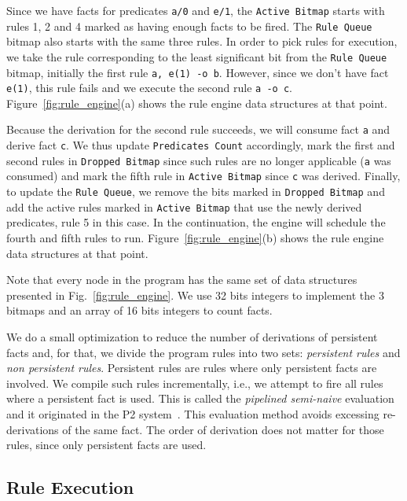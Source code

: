 \documentclass{sigplanconf}
\begin{document}
Since we have facts for predicates \texttt{a/0} and \texttt{e/1},
the \texttt{Active Bitmap} starts with rules 1, 2 and 4 marked as
having enough facts to be fired. The \texttt{Rule Queue} bitmap also
starts with the same three rules. In order to pick rules for
execution, we take the rule corresponding to the least significant bit
from the \texttt{Rule Queue} bitmap, initially the first
rule \texttt{a, e(1) -o b}. However, since we don't have
fact \texttt{e(1)}, this rule fails and we execute the second
rule \texttt{a -o c}. Figure~\ref{fig:rule_engine}(a) shows the rule
engine data structures at that point.

Because the derivation for the second rule succeeds, we will consume
fact \texttt{a} and derive fact \texttt{c}. We thus update
\texttt{Predicates Count} accordingly, mark the first 
and second rules in \texttt{Dropped Bitmap} since such rules are no
longer applicable (\texttt{a} was consumed) and mark the fifth rule
in \texttt{Active Bitmap} since \texttt{c} was derived. Finally, to
update the \texttt{Rule Queue}, we remove the bits marked
in \texttt{Dropped Bitmap} and add the active rules marked
in \texttt{Active Bitmap} that use the newly derived predicates, rule
5 in this case. In the continuation, the engine will schedule the
fourth and fifth rules to run. Figure~\ref{fig:rule_engine}(b) shows
the rule engine data structures at that point.

Note that every node in the program has the same set of data
structures presented in Fig.~\ref{fig:rule_engine}. We use 32 bits
integers to implement the 3 bitmaps and an array of 16 bits integers to
count facts.

We do a small optimization to reduce the number of derivations of
persistent facts and, for that, we divide the program rules into two
sets: \emph{persistent rules} and \emph{non persistent rules}.
Persistent rules are rules where only persistent facts are
involved. We compile such rules incrementally, i.e., we attempt to
fire all rules where a persistent fact is used. This is called
the \emph{pipelined semi-naive} evaluation and it originated in the P2
system~\cite{Loo-condie-garofalakis-p2}. This evaluation method avoids
excessing re-derivations of the same fact. The order of derivation
does not matter for those rules, since only persistent facts are used.


\subsection{Rule Execution}
\end{document}
